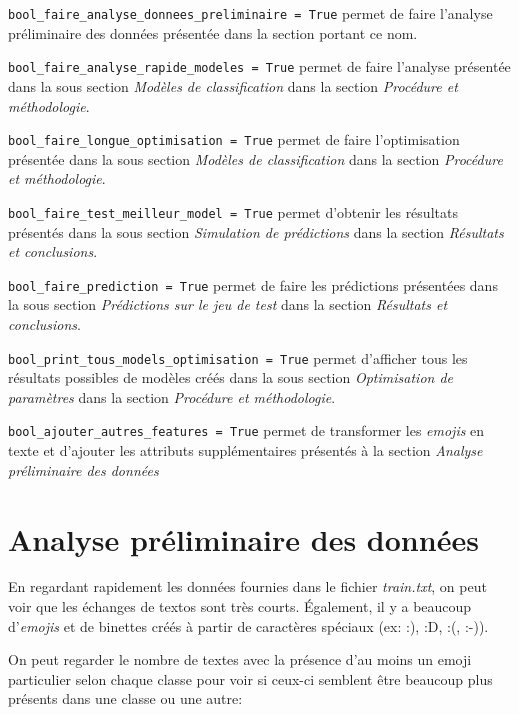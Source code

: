 \documentclass[12pt,french]{article}
\begin{document}
\verb|bool_faire_analyse_donnees_preliminaire = True| permet de faire l'analyse préliminaire des données présentée dans la section portant ce nom. 

\verb|bool_faire_analyse_rapide_modeles = True| permet de faire l'analyse présentée dans la sous section \emph{Modèles de classification} dans la section \emph{Procédure et méthodologie}. 

\verb|bool_faire_longue_optimisation = True| permet de faire l'optimisation présentée dans la sous section \emph{Modèles de classification} dans la section \emph{Procédure et méthodologie}. 

\verb|bool_faire_test_meilleur_model = True| permet d'obtenir les résultats présentés dans la sous section \emph{Simulation de prédictions} dans la section \emph{Résultats et conclusions}. 

\verb|bool_faire_prediction = True| permet de faire les prédictions présentées dans la sous section \emph{Prédictions sur le jeu de test} dans la section \emph{Résultats et conclusions}. 

\verb|bool_print_tous_models_optimisation = True| permet d'afficher tous les résultats possibles de modèles créés dans la sous section \emph{Optimisation de paramètres} dans la section \emph{Procédure et méthodologie}. 

\verb|bool_ajouter_autres_features = True| permet de transformer les \emph{emojis} en texte et d'ajouter les attributs supplémentaires présentés à la section \emph{Analyse préliminaire des données}

\clearpage

\section{Analyse préliminaire des données}
En regardant rapidement les données fournies dans le fichier \emph{train.txt}, on peut voir que les échanges de textos sont très courts. Également, il y a beaucoup d'\emph{emojis} et de binettes créés à partir de caractères spéciaux (ex: :), :D, :(, :-)).

On peut regarder le nombre de textes avec la présence d'au moins un emoji particulier selon chaque classe pour voir si ceux-ci semblent être beaucoup plus présents dans une classe ou une autre:
\end{document}
